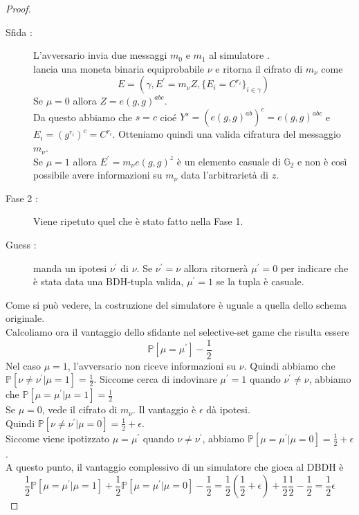 \begin{thm}
\begin{proof}
\begin{description}
\item[Sfida :] L'avversario  invia due messaggi $m_0$ e $m_1$ al simulatore .\\
 lancia una moneta binaria equiprobabile $\nu$ e ritorna il cifrato di $m_\nu$ come
\[ E = (\gamma , E^\prime = m_\nu Z , \{ E_i = C^{r_i} \}_{i \in \gamma} ) \]
Se $\mu = 0$ allora $Z = e(g,g)^{abc}$.\\
Da questo abbiamo che $s = c$ cioé $Y^s = (e(g,g)^{ab})^c = e(g,g)^{abc}$ e $E_i = (g^{r_i})^c = C^{r_i}$. Otteniamo quindi una valida cifratura del messaggio $m_\nu$.\\
Se $\mu = 1$ allora $E^\prime = m_\nu e(g,g)^z$ è un elemento casuale di $\mathbb{G}_2$ e non è così possibile avere informazioni su $m_\nu$ data l'arbitrarietà di $z$.
\item[Fase 2 :] Viene ripetuto quel che è stato fatto nella Fase 1.
\item[Guess :]  manda un ipotesi $\nu^\prime$ di $\nu$. Se $\nu^\prime = \nu$ allora  ritornerà $\mu^\prime = 0$ per indicare che è stata data una BDH-tupla valida, $\mu^\prime = 1$ se la tupla è casuale.
\end{description}

Come si può vedere, la costruzione del simulatore è uguale a quella dello schema originale.\\[0.5cm]

Calcoliamo ora il vantaggio dello sfidante nel selective-set game che risulta essere
\[\mathbb{P}[ \mu = \mu^\prime] - \frac{1}{2} \]
Nel caso $\mu = 1$, l'avversario non riceve informazioni su $\nu$.
Quindi abbiamo che $\mathbb{P}[\nu \neq \nu^\prime | \mu = 1] = \frac{1}{2}$.
Siccome  cerca di indovinare $\mu^\prime = 1$ quando $\nu^\prime \neq \nu$, abbiamo che $\mathbb{P}[\mu = \mu^\prime| \mu = 1] = \frac{1}{2}$\\[0.2cm]
Se $\mu = 0$,  vede il cifrato di $m_\nu$. Il vantaggio è $\epsilon$ dà ipotesi.\\
Quindi $\mathbb{P}[\nu \neq \nu^\prime | \mu = 0] = \frac{1}{2} + \epsilon$.\\
Siccome viene ipotizzato $ \mu = \mu^\prime$ quando $\nu \neq \nu^\prime$, abbiamo $\mathbb{P}[\mu = \mu^\prime | \mu = 0] = \frac{1}{2} + \epsilon$.\\[0.2cm]
A questo punto, il vantaggio complessivo di un simulatore che gioca al DBDH è 
\[ \frac{1}{2} \mathbb{P}[\mu = \mu^\prime | \mu = 1] + \frac{1}{2}\mathbb{P}[\mu = \mu^\prime | \mu = 0] - \frac{1}{2}  = \frac{1}{2}\left( \frac{1}{2} + \epsilon \right) + \frac{1}{2}\frac{1}{2} - \frac{1}{2} = \frac{1}{2} \epsilon\]
\end{proof}
\end{thm}

